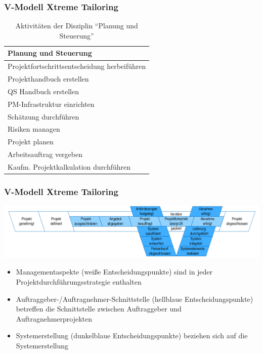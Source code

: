 \begin{frame}
\frametitle{V-Modell Xtreme Tailoring}
	\begin{table}
		\caption{Aktivitäten der Disziplin ``Planung und Steuerung''}
		\begin{tabular}{l}
				Planung und Steuerung\\ \hline
				Projektfortschrittsentscheidung herbeiführen \\
				Projekthandbuch erstellen \\
				QS Handbuch erstellen \\
				PM-Infrastruktur einrichten \\
				Schätzung durchführen \\
				Risiken managen \\
				Projekt planen \\
				Arbeitsauftrag vergeben \\
				Kaufm. Projektkalkulation durchführen
		\end{tabular}
	\end{table}
\end{frame}

\begin{frame}
\frametitle{V-Modell Xtreme Tailoring}
	\center\includegraphics[width=1\textwidth,
			keepaspectratio=true]{bilder/vmodell_xt.png}
	\begin{itemize}
		\item Managementaspekte (weiße Entscheidungspunkte) sind in jeder Projektdurchführungsstrategie enthalten
		\item Auftraggeber-/Auftragnehmer-Schnittstelle (hellblaue Entscheidungspunkte) betreffen die Schnittstelle
		zwischen Auftraggeber und Auftragnehmerprojekten
		\item Systemerstellung (dunkelblaue Entscheidungspunkte) beziehen sich auf die Systemerstellung
	\end{itemize}
\end{frame}

